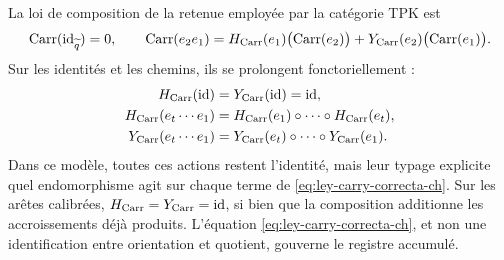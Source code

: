 La loi de composition de la retenue employée par la catégorie TPK est
\begin{equation}
 \operatorname{Carr}(\operatorname{id}_{\widetilde q})=0,\qquad
 \operatorname{Carr}(e_2e_1)
 =H_{\rm Carr}(e_1)\bigl(\operatorname{Carr}(e_2)\bigr)
  +Y_{\rm Carr}(e_2)\bigl(\operatorname{Carr}(e_1)\bigr).
 \label{eq:ley-carry-correcta-ch}
\end{equation}
Sur les identités et les chemins, ils se prolongent fonctoriellement :
\[
\begin{aligned}
 H_{\rm Carr}(\operatorname{id})
   &=Y_{\rm Carr}(\operatorname{id})=\operatorname{id},\\
 H_{\rm Carr}(e_t\cdots e_1)
   &=H_{\rm Carr}(e_1)\circ\cdots\circ H_{\rm Carr}(e_t),\\
 Y_{\rm Carr}(e_t\cdots e_1)
   &=Y_{\rm Carr}(e_t)\circ\cdots\circ Y_{\rm Carr}(e_1).
\end{aligned}
\]
Dans ce modèle, toutes ces actions restent l'identité, mais leur typage explicite quel endomorphisme agit sur chaque terme de \eqref{eq:ley-carry-correcta-ch}.
Sur les arêtes calibrées, \(H_{\rm Carr}=Y_{\rm Carr}=\operatorname{id}\), si bien que la composition additionne les accroissements déjà produits. L'équation \eqref{eq:ley-carry-correcta-ch}, et non une identification entre orientation et quotient, gouverne le registre accumulé.

